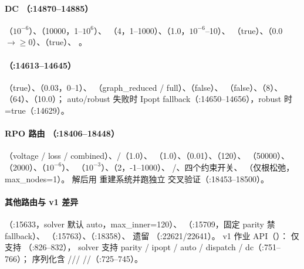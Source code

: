 \paragraph{DC （:14870--14885）}
（$10^{-6}$）、（10000，1--$10^6$）、
（4，1--1000）、（1.0，$10^{-6}$--10）、
（true）、（0.0$\to\ge0$）、（true）、
。

\paragraph{（:14613--14645）}
（true）、（0.03，0--1）、
（graph\_reduced / full）、（false）、
（false）、（8）、
（64）、（10.0）；
auto/robust 失败时 Ipopt fallback（:14650--14656），robust 时
=true（:14629）。

\paragraph{RPO 路由 （:18406--18448）}
（voltage / loss / combined）、/（1.0）、
（1.0）、（0.01）、（120）、
（50000）、（2000）、（$10^{-6}$）、
（$10^{-3}$）、（2，-1--1000）、
/、四个约束开关、
（仅根松弛，max\_nodes=1）。
解后用  重建系统并跑独立
 交叉验证（:18453--18500）。

\paragraph{其他路由与 v1 差异}
（:15633，solver 默认 auto，max\_inner=120）、
（:15709，固定 parity 禁 fallback）、
（:15763）、（:18358）、
遗留 （:22621/22641）。
v1 作业 API（）：
 仅支持 （:826--832），
solver 支持 parity / ipopt / auto / dispatch / dc（:751--766）；
序列化含 ///
//（:725--745）。

